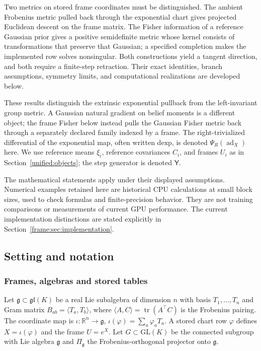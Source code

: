 \documentclass[11pt]{article}
\theoremstyle{definition}
\theoremstyle{remark}
\providecommand{\GL}{\mathrm{GL}}
\providecommand{\gl}{\mathfrak{gl}}
\providecommand{\tr}{\operatorname{tr}}
\providecommand{\R}{\mathbb{R}}
\providecommand{\g}{\mathfrak{g}}
\providecommand{\ip}[2]{\langle #1, #2\rangle}
\begin{document}
Two metrics on stored frame coordinates must be distinguished. The ambient Frobenius metric pulled back through the exponential chart gives projected Euclidean descent on the frame matrix. The Fisher information of a reference Gaussian prior gives a positive semidefinite metric whose kernel consists of transformations that preserve that Gaussian; a specified completion makes the implemented row solves nonsingular. Both constructions yield a tangent direction, and both require a finite-step retraction. Their exact identities, branch assumptions, symmetry limits, and computational realizations are developed below.

These results distinguish the extrinsic exponential pullback from the left-invariant group metric. A Gaussian natural gradient on belief moments is a different object; the frame Fisher below instead pulls the Gaussian Fisher metric back through a separately declared family indexed by a frame. The right-trivialized differential of the exponential map, often written \(\mathrm{dexp}\), is denoted \(\Psi_R(\operatorname{ad}_X)\) here. We use reference means \(\xi_i\), reference covariances \(C_i\), and frames \(U_i\) as in Section~\ref{unified:objects}; the step generator is denoted \(\mathsf Y\).

The mathematical statements apply under their displayed assumptions. Numerical examples retained here are historical CPU calculations at small block sizes, used to check formulas and finite-precision behavior. They are not training comparisons or measurements of current GPU performance. The current implementation distinctions are stated explicitly in Section~\ref{frame:sec:implementation}.

\subsection{Setting and notation}\label{frame:sec:setting}

\subsubsection{Frames, algebras and stored tables}

Let $\g\subset\gl(K)$ be a real Lie subalgebra of dimension $n$ with basis $T_1,\dots,T_n$ and Gram matrix $B_{ab}=\ip{T_a}{T_b}$, where $\ip{A}{C}=\tr(A^\top C)$ is the Frobenius pairing. The coordinate map is $\iota:\R^n\to\g$, $\iota(\varphi)=\sum_a\varphi_aT_a$. A stored chart row $\varphi$ defines $X=\iota(\varphi)$ and the frame $U=e^X$. Let $G\subset\GL(K)$ be the connected subgroup with Lie algebra $\g$ and $\Pi_\g$ the Frobenius-orthogonal projector onto $\g$.
\end{document}
